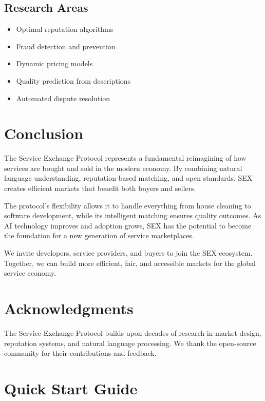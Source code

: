 \documentclass[11pt,a4paper]{article}
\begin{document}
\subsection{Research Areas}

\begin{itemize}
    \item Optimal reputation algorithms
    \item Fraud detection and prevention
    \item Dynamic pricing models
    \item Quality prediction from descriptions
    \item Automated dispute resolution
\end{itemize}

\section{Conclusion}

The Service Exchange Protocol represents a fundamental reimagining of how services are bought and sold in the modern economy. By combining natural language understanding, reputation-based matching, and open standards, SEX creates efficient markets that benefit both buyers and sellers.

The protocol's flexibility allows it to handle everything from house cleaning to software development, while its intelligent matching ensures quality outcomes. As AI technology improves and adoption grows, SEX has the potential to become the foundation for a new generation of service marketplaces.

We invite developers, service providers, and buyers to join the SEX ecosystem. Together, we can build more efficient, fair, and accessible markets for the global service economy.

\section*{Acknowledgments}

The Service Exchange Protocol builds upon decades of research in market design, reputation systems, and natural language processing. We thank the open-source community for their contributions and feedback.

\appendix

\section{Quick Start Guide}
\end{document}

